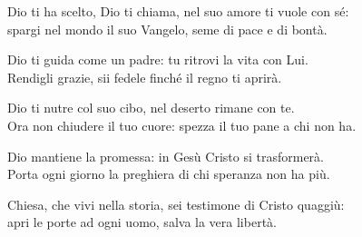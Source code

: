 

\spazio

\strofa Dio ti ha scelto, Dio ti chiama, nel suo amore ti vuole con sé:\\
spargi nel mondo il suo Vangelo, seme di pace e di bontà.

\spazio


\spazio

\strofa Dio ti guida come un padre: tu ritrovi la vita con Lui.\\
Rendigli grazie, sii fedele finché il regno ti aprirà.

\spazio


\spazio

\strofa Dio ti nutre col suo cibo, nel deserto rimane con te.\\
Ora non chiudere il tuo cuore: spezza il tuo pane a chi non ha.

\spazio


\spazio

\strofa Dio mantiene la promessa: in Gesù Cristo si trasformerà.\\
Porta ogni giorno la preghiera di chi speranza non ha più.

\spazio


\spazio

\strofa Chiesa, che vivi nella storia, sei testimone di Cristo quaggiù:\\
apri le porte ad ogni uomo, salva la vera libertà.

\spazio

